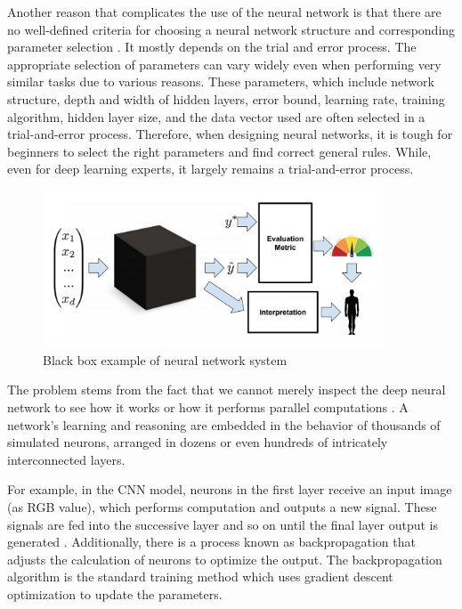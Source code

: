 Another reason that complicates the use of the neural network is that there are no well-defined criteria for choosing a neural network structure and corresponding parameter selection \cite{dlvwz}. It mostly depends on the trial and error process. The appropriate selection of parameters can vary widely even when performing very similar tasks due to various reasons. These parameters, which include network structure, depth and width of hidden layers, error bound, learning rate, training algorithm, hidden layer size, and the data vector used are often selected in a trial-and-error process. Therefore, when designing neural networks, it is tough for beginners to select the right parameters and find correct general rules. While, even for deep learning experts, it largely remains a trial-and-error process.

\begin{figure}[htbp]
\centering
\includegraphics[width=0.90\textwidth]{images/Black-box.png}
\caption{Black box example of neural network system}
\label{fig:blackbox}
\end{figure}

The problem stems from the fact that we cannot merely inspect the deep neural network to see how it works or how it performs parallel computations \cite{darksecretaimittr}. A network’s learning and reasoning are embedded in the behavior of thousands of simulated neurons, arranged in dozens or even hundreds of intricately interconnected layers. 

For example, in the CNN model, neurons in the first layer receive an input image (as RGB value), which performs computation and outputs a new signal. These signals are fed into the successive layer and so on until the final layer output is generated \cite{darksecretaimittr}. Additionally, there is a process known as backpropagation that adjusts the calculation of neurons to optimize the output. The backpropagation algorithm is the standard training method which uses gradient descent optimization to update the parameters.

